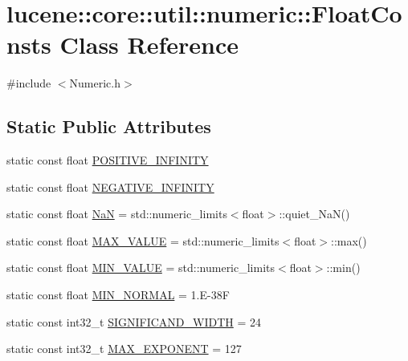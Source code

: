 \hypertarget{classlucene_1_1core_1_1util_1_1numeric_1_1FloatConsts}{}\section{lucene\+:\+:core\+:\+:util\+:\+:numeric\+:\+:Float\+Consts Class Reference}
\label{classlucene_1_1core_1_1util_1_1numeric_1_1FloatConsts}


{\ttfamily \#include $<$Numeric.\+h$>$}

\subsection*{Static Public Attributes}
\begin{DoxyCompactItemize}
\item 
static const float \mbox{\hyperlink{classlucene_1_1core_1_1util_1_1numeric_1_1FloatConsts_a75ea31ef5c080a082a10b59f07b4eb0c}{P\+O\+S\+I\+T\+I\+V\+E\+\_\+\+I\+N\+F\+I\+N\+I\+TY}}
\item 
static const float \mbox{\hyperlink{classlucene_1_1core_1_1util_1_1numeric_1_1FloatConsts_a34817e1fd3ed6cd545e0942d565bfac5}{N\+E\+G\+A\+T\+I\+V\+E\+\_\+\+I\+N\+F\+I\+N\+I\+TY}}
\item 
static const float \mbox{\hyperlink{classlucene_1_1core_1_1util_1_1numeric_1_1FloatConsts_a302af30adff8f767ee41336252b712bf}{NaN}} = std\+::numeric\+\_\+limits$<$float$>$\+::quiet\+\_\+\+NaN()
\item 
static const float \mbox{\hyperlink{classlucene_1_1core_1_1util_1_1numeric_1_1FloatConsts_a6fbf8697fc67683538ca7148f7ef8fb4}{M\+A\+X\+\_\+\+V\+A\+L\+UE}} = std\+::numeric\+\_\+limits$<$float$>$\+::max()
\item 
static const float \mbox{\hyperlink{classlucene_1_1core_1_1util_1_1numeric_1_1FloatConsts_ab1e1437da563ab653ac53b172ad329fe}{M\+I\+N\+\_\+\+V\+A\+L\+UE}} = std\+::numeric\+\_\+limits$<$float$>$\+::min()
\item 
static const float \mbox{\hyperlink{classlucene_1_1core_1_1util_1_1numeric_1_1FloatConsts_a33230f66e95cc314647c8e4885c2531c}{M\+I\+N\+\_\+\+N\+O\+R\+M\+AL}} = 1.\+E-\/38F
\item 
static const int32\+\_\+t \mbox{\hyperlink{classlucene_1_1core_1_1util_1_1numeric_1_1FloatConsts_ad2ae39947a05c4c8ee4c788319ccd11f}{S\+I\+G\+N\+I\+F\+I\+C\+A\+N\+D\+\_\+\+W\+I\+D\+TH}} = 24
\item 
static const int32\+\_\+t \mbox{\hyperlink{classlucene_1_1core_1_1util_1_1numeric_1_1FloatConsts_aea2cb8c04c11ab7d614b1d7d714945a1}{M\+A\+X\+\_\+\+E\+X\+P\+O\+N\+E\+NT}} = 127

\end{DoxyCompactItemize}
